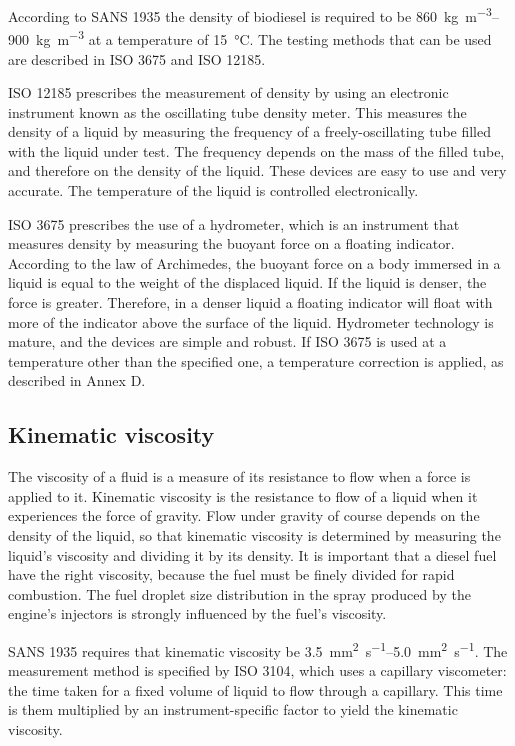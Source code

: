 According to SANS 1935 the density of biodiesel is required to be
\SIrange{860}{900}{\kilogram\per\cubic\metre} at a temperature of
\SI{15}{\celsius}. The testing methods that can be used are described in ISO
3675 and ISO 12185.

ISO 12185 prescribes the measurement of density by using an electronic
instrument known as the oscillating tube density meter. This measures the
density of a liquid by measuring the frequency of a freely-oscillating tube
filled with the liquid under test. The frequency depends on the mass of the
filled tube, and therefore on the density of the liquid.
These devices are easy to use and very accurate. The temperature of the liquid
is controlled electronically.

ISO 3675 prescribes the use of a hydrometer, which is an instrument that
measures density by measuring the buoyant force on a floating indicator.
According to the law of Archimedes, the buoyant force on a body immersed in a
liquid is equal to the weight of the displaced liquid. If the liquid is denser,
the force is greater. Therefore, in a denser liquid a floating indicator will
float with more of the indicator above the surface of the liquid. Hydrometer
technology is mature, and the devices are simple and robust.  If ISO 3675 is
used at a temperature other than the specified one, a temperature correction is
applied, as described in Annex D.

\subsection{Kinematic viscosity}

The viscosity of a fluid is a measure of its resistance to flow when a force is
applied to it. Kinematic viscosity is the resistance to flow of a liquid when it
experiences the force of gravity. Flow under gravity of course depends on the
density of the liquid, so that kinematic viscosity is determined by measuring
the liquid's viscosity and dividing it by its density. It is important that a
diesel fuel have the right viscosity, because the fuel must be finely divided
for rapid combustion. The fuel droplet size distribution in the spray produced
by the engine's injectors is strongly influenced by the fuel's viscosity.

SANS 1935 requires that kinematic viscosity be
\SIrange{3.5}{5.0}{\milli\metre\squared\per\second}. The measurement method is
specified by ISO 3104, which uses a capillary viscometer: the time taken for a
fixed volume of liquid to flow through a capillary. This time is them multiplied
by an instrument-specific factor to yield the kinematic viscosity.

